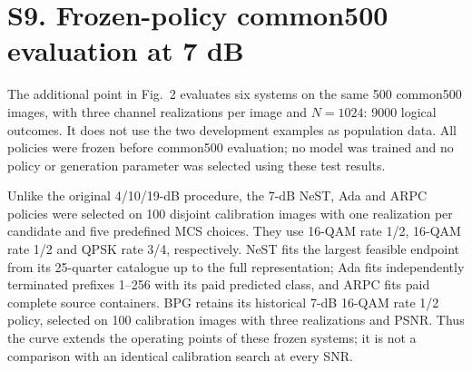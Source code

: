 \clearpage\section*{S9. Frozen-policy common500 evaluation at 7 dB}
The additional point in Fig.~2 evaluates six systems on the same 500 common500 images, with three channel realizations per image and $N=1024$: 9000 logical outcomes. It does not use the two development examples as population data. All policies were frozen before common500 evaluation; no model was trained and no policy or generation parameter was selected using these test results.

Unlike the original 4/10/19-dB procedure, the 7-dB NeST, Ada and ARPC policies were selected on 100 disjoint calibration images with one realization per candidate and five predefined MCS choices. They use 16-QAM rate 1/2, 16-QAM rate 1/2 and QPSK rate 3/4, respectively. NeST fits the largest feasible endpoint from its 25-quarter catalogue up to the full representation; Ada fits independently terminated prefixes 1--256 with its paid predicted class, and ARPC fits paid complete source containers. BPG retains its historical 7-dB 16-QAM rate 1/2 policy, selected on 100 calibration images with three realizations and PSNR. Thus the curve extends the operating points of these frozen systems; it is not a comparison with an identical calibration search at every SNR.

